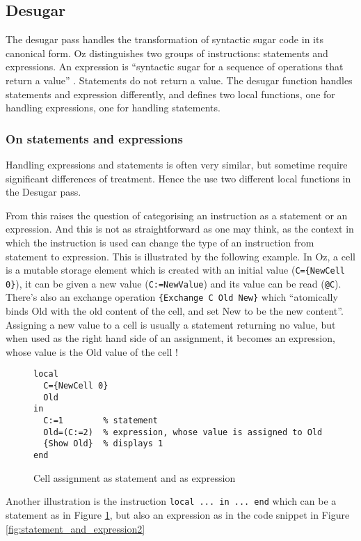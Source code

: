 \documentclass[a4paper]{memoir}
\begin{document}
\subsection{Desugar}\label{sec:arch:desugar}
The desugar pass handles the transformation of syntactic sugar code in its canonical form.
Oz distinguishes two groups of instructions: statements and expressions. An expression is ``syntactic sugar for a sequence of operations that return a value'' . Statements do not return a value.
The desugar function handles statements and expression differently, and defines two local functions, one for handling expressions, one for handling statements.
\subsubsection{On statements and expressions}
Handling expressions and statements is often very similar, but sometime require significant differences of treatment. Hence the use two different local functions in the Desugar pass.

From this raises the question of categorising an instruction as a statement or an expression. And this is not as straightforward as one may think, as the context in which the instruction is used can change the type of an instruction from statement to expression. This is illustrated by the following example.
In Oz, a cell is a mutable storage element which is created with an initial value (\lstinline!C={NewCell 0}!), it can be given a new value (\lstinline!C:=NewValue!) and its value can be read (\lstinline!@C!). There's also an exchange operation \lstinline!{Exchange C Old New}! which ``atomically binds Old with the old content of the cell, and set New to be the new content''.%
Assigning a new value to a cell is usually a statement returning no value, but when used as the right hand side of an assignment, it becomes an expression, whose value is the Old value of the cell !
\begin{figure}[h]
\begin{lstlisting}
local
  C={NewCell 0}
  Old
in
  C:=1        % statement
  Old=(C:=2)  % expression, whose value is assigned to Old
  {Show Old}  % displays 1
end

\end{lstlisting}
\caption{Cell assignment as statement and as expression}
\label{fig:statement_and_expression1}
\end{figure}
Another illustration is the instruction \lstinline!local ... in ... end! which can be a statement as in Figure \ref{fig:statement_and_expression1}, but also an expression as in the code snippet in Figure \ref{fig:statement_and_expression2}
\end{document}
